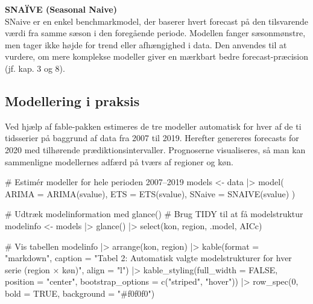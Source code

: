 \documentclass[
]{article}
\newenvironment{Shaded}{\begin{snugshade}}{\end{snugshade}}
\newcommand{\AttributeTok}[1]{\textcolor[rgb]{0.40,0.45,0.13}{#1}}
\newcommand{\CommentTok}[1]{\textcolor[rgb]{0.37,0.37,0.37}{#1}}
\newcommand{\ConstantTok}[1]{\textcolor[rgb]{0.56,0.35,0.01}{#1}}
\newcommand{\DecValTok}[1]{\textcolor[rgb]{0.68,0.00,0.00}{#1}}
\newcommand{\FunctionTok}[1]{\textcolor[rgb]{0.28,0.35,0.67}{#1}}
\newcommand{\NormalTok}[1]{\textcolor[rgb]{0.00,0.23,0.31}{#1}}
\newcommand{\OtherTok}[1]{\textcolor[rgb]{0.00,0.23,0.31}{#1}}
\newcommand{\SpecialCharTok}[1]{\textcolor[rgb]{0.37,0.37,0.37}{#1}}
\newcommand{\StringTok}[1]{\textcolor[rgb]{0.13,0.47,0.30}{#1}}
\begin{document}
\textbf{SNAÏVE (Seasonal Naive)}\\
SNaive er en enkel benchmarkmodel, der baserer hvert forecast på den
tilsvarende værdi fra samme sæson i den foregående periode. Modellen
fanger sæsonmønstre, men tager ikke højde for trend eller afhængighed i
data. Den anvendes til at vurdere, om mere komplekse modeller giver en
mærkbart bedre forecast-præcision (jf. kap. 3 og 8).

\subsection{Modellering i praksis}\label{modellering-i-praksis}

Ved hjælp af fable-pakken estimeres de tre modeller automatisk for hver
af de ti tidsserier på baggrund af data fra 2007 til 2019. Herefter
genereres forecasts for 2020 med tilhørende prædiktionsintervaller.
Prognoserne visualiseres, så man kan sammenligne modellernes adfærd på
tværs af regioner og køn.

\begin{Shaded}
\begin{Highlighting}[]
\CommentTok{\# Estimér modeller for hele perioden 2007–2019}
\NormalTok{models }\OtherTok{\textless{}{-}}\NormalTok{ data }\SpecialCharTok{|\textgreater{}} 
  \FunctionTok{model}\NormalTok{(}
    \AttributeTok{ARIMA  =} \FunctionTok{ARIMA}\NormalTok{(svalue),}
    \AttributeTok{ETS    =} \FunctionTok{ETS}\NormalTok{(svalue),}
    \AttributeTok{SNaive =} \FunctionTok{SNAIVE}\NormalTok{(svalue)}
\NormalTok{  )}

\CommentTok{\# Udtræk modelinformation med glance()}
\CommentTok{\# Brug TIDY til at få modelstruktur}
\NormalTok{modelinfo }\OtherTok{\textless{}{-}}\NormalTok{ models }\SpecialCharTok{|\textgreater{}}
  \FunctionTok{glance}\NormalTok{() }\SpecialCharTok{|\textgreater{}}
  \FunctionTok{select}\NormalTok{(kon, region, .model, AICc)}


\CommentTok{\# Vis tabellen}
\NormalTok{modelinfo }\SpecialCharTok{|\textgreater{}} 
  \FunctionTok{arrange}\NormalTok{(kon, region) }\SpecialCharTok{|\textgreater{}} 
  \FunctionTok{kable}\NormalTok{(}\AttributeTok{format =} \StringTok{"markdown"}\NormalTok{,}
        \AttributeTok{caption =} \StringTok{"Tabel 2: Automatisk valgte modelstrukturer for hver serie (region × køn)"}\NormalTok{,}
        \AttributeTok{align =} \StringTok{"l"}\NormalTok{) }\SpecialCharTok{|\textgreater{}} 
  \FunctionTok{kable\_styling}\NormalTok{(}\AttributeTok{full\_width =} \ConstantTok{FALSE}\NormalTok{, }\AttributeTok{position =} \StringTok{"center"}\NormalTok{, }\AttributeTok{bootstrap\_options =} \FunctionTok{c}\NormalTok{(}\StringTok{"striped"}\NormalTok{, }\StringTok{"hover"}\NormalTok{)) }\SpecialCharTok{|\textgreater{}} 
  \FunctionTok{row\_spec}\NormalTok{(}\DecValTok{0}\NormalTok{, }\AttributeTok{bold =} \ConstantTok{TRUE}\NormalTok{, }\AttributeTok{background =} \StringTok{"\#f0f0f0"}\NormalTok{)}
\end{Highlighting}
\end{Shaded}
\end{document}

